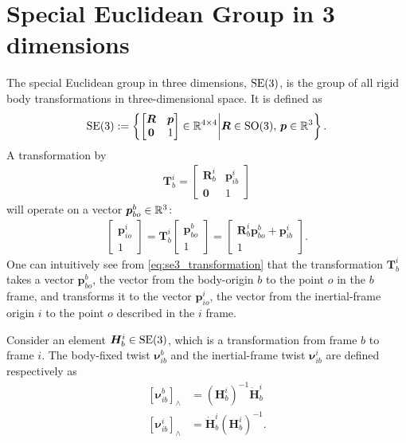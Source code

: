 \section{Special Euclidean Group in 3 dimensions}
\label{sec:bp:se3}

The special Euclidean group in three dimensions, $\operatorname{SE}(3)$, is the group of all
rigid body transformations in three-dimensional space. It is defined as
\begin{align}
    \operatorname{SE}(3) := \left\{ \begin{bmatrix}
        \bm{R} & \bm{p} \\
        \bm{0} & 1
    \end{bmatrix}
        \in \mathbb{R}^{4 \times 4} \middle| \bm{R} \in \operatorname{SO}(3), \, \bm{p} \in \mathbb{R}^3
    \right\}.
\end{align}
A transformation by 
\begin{align}
    \bm{T}_b^i = \begin{bmatrix}
        \bm{R}_{b}^i & \bm{p}_{ib}^i \\
        \bm{0} & 1
    \end{bmatrix}
\end{align}
will operate on a vector $\bm{p}_{bo}^b \in \mathbb{R}^3$:
\begin{align}
    \begin{bmatrix}
        \bm{p}_{io}^i  \\
        1
    \end{bmatrix}
    =
    \bm{T}_b^i \begin{bmatrix}
        \bm{p}_{bo}^b \\
        1
    \end{bmatrix}
    =
    \begin{bmatrix}
        \bm{R}_{b}^i \bm{p}_{bo}^b + \bm{p}_{ib}^i \\
        1
    \end{bmatrix}.
    \label{eq:se3_transformation}
\end{align}
One can intuitively see from \autoref{eq:se3_transformation} that the transformation
$\bm{T}_b^i$
takes a vector $\bm{p}_{bo}^b$, the vector from the body-origin $b$ to the point $o$
in the $b$ frame, and transforms it to the vector $\bm{p}_{io}^i$, the vector from
the inertial-frame origin $i$ to the point $o$ described in the $i$ frame.


Consider an element $\bm{H}_{b}^i \in \operatorname{SE}(3)$, which is a transformation from frame
$b$ to frame $i$. The body-fixed twist $\bm{\nu}_{ib}^b$ and the inertial-frame
twist $\bm{\nu}_{ib}^i$ are defined respectively as
\begin{subequations}
\begin{align}
    [\bm{\nu}_{ib}^b]_{\wedge} &= \left(\bm{H}_{b}^i\right)^{-1}\dot{\bm{H}}_{b}^i \label{eq:body_twist_def}\\
    [\bm{\nu}_{ib}^i]_{\wedge} &= \dot{\bm{H}}_{b}^i \left(\bm{H}_{b}^i\right)^{-1}. 
\end{align}
\end{subequations}

